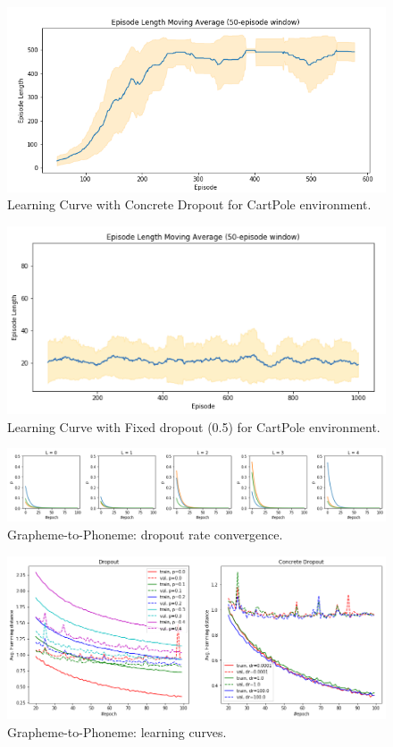 \documentclass{article}
\begin{document}
 \begin{figure}[!h]
      \centering
      \includegraphics[scale = 0.28]{model_free_1.png}
      \caption{Learning Curve with Concrete Dropout for CartPole environment.}
      \label{fig:rl_cd}
  \end{figure}
  \begin{figure}[!h]
      \centering
      \includegraphics[scale = 0.35]{model_free_2.png}
      \caption{Learning Curve with Fixed dropout (0.5) for CartPole environment.}
      \label{fig:rl_fix}
  \end{figure}

\begin{figure}[!h]
\centering
\centering
\includegraphics[width=\linewidth]{nlp_probs.png}
\caption{Grapheme-to-Phoneme: dropout rate convergence.}
\label{fig:nlpprobs}
\end{figure}

\begin{figure}[!h]
\centering
\centering
\includegraphics[width=\linewidth]{nlp_curves.png}
\caption{Grapheme-to-Phoneme: learning curves.}
\label{fig:nlpcurves}
\end{figure}
\end{document}
